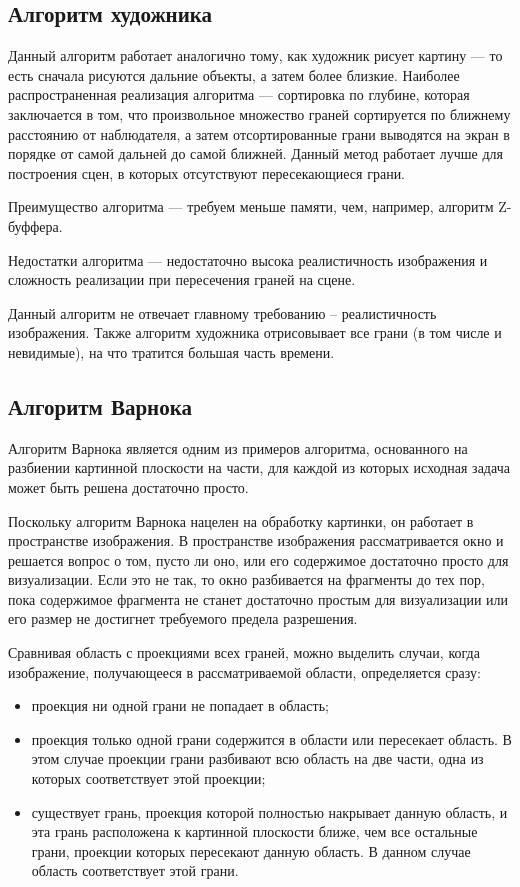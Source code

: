 \subsection{Алгоритм художника}

Данный алгоритм работает аналогично тому, как художник рисует картину --- то есть сначала рисуются дальние объекты, а затем более близкие. Наиболее распространенная реализация алгоритма --- сортировка по глубине, которая заключается в том, что произвольное множество граней сортируется по ближнему расстоянию от наблюдателя, а затем отсортированные грани выводятся на экран в порядке от самой дальней до самой ближней. Данный метод работает лучше для построения сцен, в которых отсутствуют пересекающиеся грани.

Преимущество алгоритма --- требуем меньше памяти, чем, например, алгоритм Z-буффера.

Недостатки алгоритма --- недостаточно высока реалистичность изображения и сложность реализации при пересечения граней на сцене.

Данный алгоритм не отвечает главному требованию – реалистичность изображения. Также алгоритм художника отрисовывает все грани (в том числе и невидимые), на что тратится большая часть времени.

\subsection{Алгоритм Варнока}

Алгоритм Варнока является одним из примеров алгоритма, основанного на разбиении картинной плоскости на части, для каждой из которых исходная задача может быть решена достаточно просто.

Поскольку алгоритм Варнока нацелен на обработку картинки, он работает в пространстве изображения. В пространстве изображения рассматривается окно и решается вопрос о том, пусто ли оно, или его содержимое достаточно просто для визуализации. Если это не так, то окно разбивается на фрагменты до тех пор, пока содержимое фрагмента не станет достаточно простым для визуализации или его размер не достигнет требуемого предела разрешения.

Сравнивая область с проекциями всех граней, можно выделить случаи, когда изображение, получающееся в рассматриваемой области, определяется сразу:

\begin{itemize}
	\item проекция ни одной грани не попадает в область;
	\item проекция только одной грани содержится в области или пересекает область. В этом случае проекции грани разбивают всю область на две части, одна из которых соответствует этой проекции;
	\item существует грань, проекция которой полностью накрывает данную область, и эта грань расположена к картинной плоскости ближе, чем все остальные грани, проекции которых пересекают данную область. В данном случае область соответствует этой грани.
\end{itemize}

